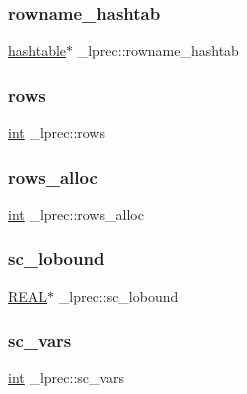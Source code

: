 \subsubsection{\texorpdfstring{rowname\+\_\+hashtab}{rowname\_hashtab}}
{\footnotesize\ttfamily \hyperlink{structhashtable}{hashtable}$\ast$ \+\_\+lprec\+::rowname\+\_\+hashtab}

\mbox{\label{struct__lprec_a9ecb6a8f337c5a8342d6215b599c42c5}} 
\subsubsection{\texorpdfstring{rows}{rows}}
{\footnotesize\ttfamily \hyperlink{lp__lib_8h_adeb9ec6400320e4923ac9d836d509ddb}{int} \+\_\+lprec\+::rows}

\mbox{\label{struct__lprec_a932a6c5cdab096bc4b0df96fc73b13f2}} 
\subsubsection{\texorpdfstring{rows\+\_\+alloc}{rows\_alloc}}
{\footnotesize\ttfamily \hyperlink{lp__lib_8h_adeb9ec6400320e4923ac9d836d509ddb}{int} \+\_\+lprec\+::rows\+\_\+alloc}

\mbox{\label{struct__lprec_a9a581e6b07c2a639589c44d4c9381c36}} 
\subsubsection{\texorpdfstring{sc\+\_\+lobound}{sc\_lobound}}
{\footnotesize\ttfamily \hyperlink{lp__lib_8h_a92bd5e363d131fa73669358edb232dce}{R\+E\+AL}$\ast$ \+\_\+lprec\+::sc\+\_\+lobound}

\mbox{\label{struct__lprec_a88d028cca3fe1573706e6db36bfa7485}} 
\subsubsection{\texorpdfstring{sc\+\_\+vars}{sc\_vars}}
{\footnotesize\ttfamily \hyperlink{lp__lib_8h_adeb9ec6400320e4923ac9d836d509ddb}{int} \+\_\+lprec\+::sc\+\_\+vars}

